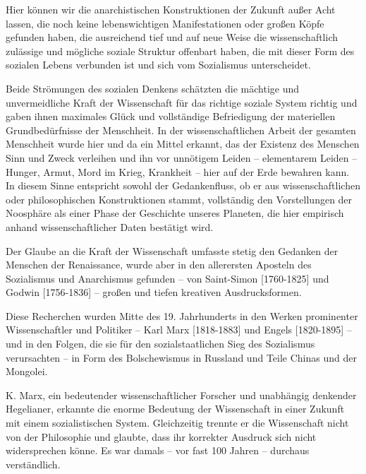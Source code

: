 \documentclass[11pt,a4paper]{book}
\begin{document}
Hier können wir die anarchistischen Konstruktionen der Zukunft außer Acht lassen, die noch keine lebenswichtigen Manifestationen oder großen Köpfe gefunden haben, die ausreichend tief und auf neue Weise die wissenschaftlich zulässige und mögliche soziale Struktur offenbart haben, die mit dieser Form des sozialen Lebens verbunden ist und sich vom Sozialismus unterscheidet.



Beide Strömungen des sozialen Denkens schätzten die mächtige und unvermeidliche Kraft der Wissenschaft für das richtige soziale System richtig und gaben ihnen maximales Glück und vollständige Befriedigung der materiellen Grundbedürfnisse der Menschheit. In der wissenschaftlichen Arbeit der gesamten Menschheit wurde hier und da ein Mittel erkannt, das der Existenz des Menschen Sinn und Zweck verleihen und ihn vor unnötigem Leiden -- elementarem Leiden -- Hunger, Armut, Mord im Krieg, Krankheit -- hier auf der Erde bewahren kann. In diesem Sinne entspricht sowohl der Gedankenfluss, ob er aus wissenschaftlichen oder philosophischen Konstruktionen stammt, vollständig den Vorstellungen der Noosphäre als einer Phase der Geschichte unseres Planeten, die hier empirisch anhand wissenschaftlicher Daten bestätigt wird.



Der Glaube an die Kraft der Wissenschaft umfasste stetig den Gedanken der Menschen der Renaissance, wurde aber in den allerersten Aposteln des Sozialismus und Anarchismus gefunden -- von Saint-Simon [1760-1825] und Godwin [1756-1836] -- großen und tiefen kreativen Ausdrucksformen.



Diese Recherchen wurden Mitte des 19. Jahrhunderts in den Werken prominenter Wissenschaftler und Politiker -- Karl Marx [1818-1883] und Engels [1820-1895] -- und in den Folgen, die sie für den sozialstaatlichen Sieg des Sozialismus verursachten -- in Form des Bolschewismus in Russland und Teile Chinas und der Mongolei.



K. Marx, ein bedeutender wissenschaftlicher Forscher und unabhängig denkender Hegelianer, erkannte die enorme Bedeutung der Wissenschaft in einer Zukunft mit einem sozialistischen System. Gleichzeitig trennte er die Wissenschaft nicht von der Philosophie und glaubte, dass ihr korrekter Ausdruck sich nicht widersprechen könne. Es war damals -- vor fast 100 Jahren -- durchaus verständlich.
\end{document}
